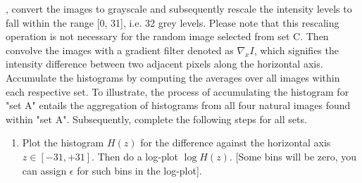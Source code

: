 \documentclass[11pt]{article}
\begin{document}
, convert the images to grayscale and subsequently rescale the intensity levels to fall within the range [0, 31], i.e. 32 grey levels. Please note that this rescaling operation is not necessary for the random image selected from set C. Then convolve the images with a gradient filter denoted as $\nabla_x I$, which signifies the intensity difference between two adjacent pixels along the horizontal axis. 
Accumulate the histograms by computing the averages over all images within each respective set. To illustrate, the process of accumulating the histogram for "set A" entails the aggregation of histograms from all four natural images found within "set A". Subsequently, complete the following steps for all sets.

\begin{enumerate}
\item Plot the histogram $H(z)$ for the difference against the horizontal axis $z \in [-31, +31]$. Then do a log-plot $\log H(z)$. [Some bins will be zero, you can assign $\epsilon$ for such bins in the log-plot]. 


\end{enumerate}
\end{document}
